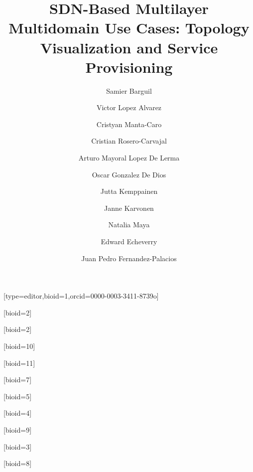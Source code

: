 \documentclass[a4paper,fleqn]{cas-dc}
\begin{document}
\let\WriteBookmarks\relax
\def\floatpagepagefraction{1}
\def\textpagefraction{.001}

\title [mode = title]{SDN-Based Multilayer Multidomain Use Cases: Topology Visualization and Service Provisioning}                      



\author[1,4]{Samier Barguil}[type=editor,bioid=1,orcid=0000-0003-3411-8739o]
\cormark[1]

\author[2]{Victor Lopez Alvarez}[bioid=2]

\author[4]{Cristyan Manta-Caro}[bioid=2]

\author[4]{Cristian Rosero-Carvajal}[bioid=10]

\author[2]{Arturo Mayoral Lopez De Lerma}[bioid=11]

\author[2]{Oscar Gonzalez De Dios}[bioid=7]

\author[5]{Jutta Kemppainen}[bioid=5]

\author[5]{Janne Karvonen}[bioid=4]

\author[5]{Natalia Maya}[bioid=9]

\author[3]{Edward Echeverry}[bioid=3]

\author[2]{Juan Pedro Fernandez-Palacios}[bioid=8]

\address[1]{Universidad Autonoma de Madrid, Madrid, Spain}
\address[2]{Telefonica I+D, Ronda de la Comunicacion, Madrid, Spain}
\address[3]{Telefonica Movistar, Transversal 60 No 114ª -55. Bogotá, Colombia}
\address[4]{Wipro Technologies Ltd., Doddakannelli, Sarjapur Road
Bengaluru - 560 035, India}
\address[5]{Infinera Corporation, 140 Caspian Court, Sunnyvale, CA 94089, USA}
\end{document}
